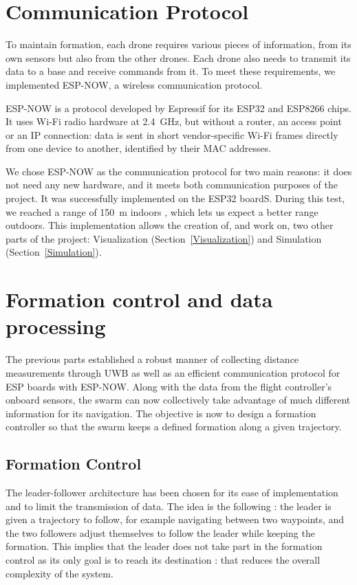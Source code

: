 \documentclass[conference]{IEEEtran}
\begin{document}
\section{Communication Protocol} \label{COM_Protocol}

To maintain formation, each drone requires various pieces of information, from
its own sensors but also from the other drones. Each drone also needs to
transmit its data to a base and receive commands from it. To meet these
requirements, we implemented ESP-NOW, a wireless communication protocol. 

ESP-NOW is a protocol developed by Espressif for its ESP32 and ESP8266 chips.
It uses Wi-Fi radio hardware at 2.4~GHz, but without a router, an access point
or an IP connection: data is sent in short vendor-specific Wi-Fi frames
directly from one device to another, identified by their MAC addresses. 

We chose ESP-NOW as the communication protocol for two main reasons: it does
not need any new hardware, and it meets both communication purposes of the project.
It was successfully implemented on the ESP32 boardS. During this test, we reached a range of 150~m indoors , which lets us expect a better range outdoors.
This implementation allows the creation of, and work on, two other parts of the project: Visualization (Section~\ref{Visualization}) and Simulation (Section~\ref{Simulation}).



\section{Formation control and data processing}

The previous parts established a robust manner of collecting distance measurements through UWB as well as an efficient communication protocol for ESP boards with ESP-NOW. Along with the data from the flight controller's onboard sensors, the swarm can now collectively take advantage of much different information for its navigation. The objective is now to design a formation controller so that the swarm keeps a defined formation along a given trajectory.

\subsection{Formation Control}

The leader-follower architecture has been chosen for its ease of implementation and to limit the transmission of data. The idea is the following : the leader is given a trajectory to follow, for example navigating between two waypoints, and the two followers adjust themselves to follow the leader while keeping the formation. This implies that the leader does not take part in the formation control as its only goal is to reach its destination : that reduces the overall complexity of the system.
\end{document}
